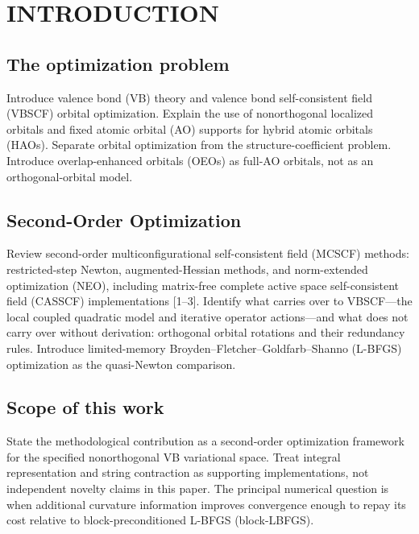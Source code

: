 \documentclass[12pt]{article}
\begin{document}

\section{INTRODUCTION}

\subsection{The optimization problem}

Introduce valence bond (VB) theory and valence bond self-consistent field (VBSCF) orbital optimization. Explain the use of nonorthogonal localized orbitals and fixed atomic orbital (AO) supports for hybrid atomic orbitals (HAOs). Separate orbital optimization from the structure-coefficient problem. Introduce overlap-enhanced orbitals (OEOs) as full-AO orbitals, not as an orthogonal-orbital model.


\subsection{Second-Order Optimization}

Review second-order multiconfigurational self-consistent field (MCSCF) methods: restricted-step Newton, augmented-Hessian methods, and norm-extended optimization (NEO), including matrix-free complete active space self-consistent field (CASSCF) implementations [1--3]. Identify what carries over to VBSCF---the local coupled quadratic model and iterative operator actions---and what does not carry over without derivation: orthogonal orbital rotations and their redundancy rules. Introduce limited-memory Broyden--Fletcher--Goldfarb--Shanno (L-BFGS) optimization as the quasi-Newton comparison.


\subsection{Scope of this work}

State the methodological contribution as a second-order optimization framework for the specified nonorthogonal VB variational space. Treat integral representation and string contraction as supporting implementations, not independent novelty claims in this paper. The principal numerical question is when additional curvature information improves convergence enough to repay its cost relative to block-preconditioned L-BFGS (block-LBFGS).
\end{document}
